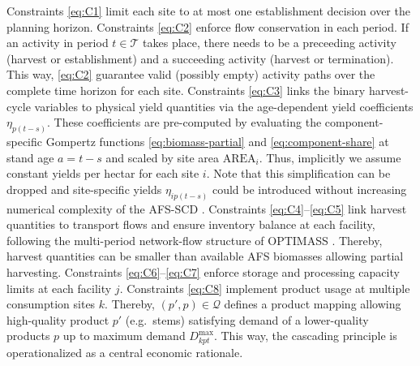 \documentclass[preprint,review,1p,authoryear]{elsarticle} %
\begin{document}
Constraints \eqref{eq:C1} limit each site to at most one establishment
decision over the planning horizon. Constraints \eqref{eq:C2} enforce
flow conservation in each period. If an activity in period \(t \in \mathcal{T}\)
takes place, there needs to be a preceeding activity (harvest or
establishment) and a succeeding activity (harvest or termination). This
way, \eqref{eq:C2} guarantee valid (possibly empty) activity paths over
the complete time horizon for each site. Constraints \eqref{eq:C3} links
the binary harvest-cycle variables to physical yield quantities via the
age-dependent yield coefficients \(\eta_{p(t-s)}\). These coefficients are
pre-computed by evaluating the component-specific Gompertz functions
\eqref{eq:biomass-partial} and \eqref{eq:component-share} at stand age
\(a = t - s\) and scaled by site area \(\text{AREA}_i\). Thus, implicitly we
assume constant yields per hectar for each site \(i\). Note that this
simplification can be dropped and site-specific yields \(\eta_{ip(t-s)}\)
could be introduced without increasing numerical complexity of the
AFS-SCD . Constraints \eqref{eq:C4}--\eqref{eq:C5} link harvest
quantities to transport flows and ensure inventory balance at each
facility, following the multi-period network-flow structure of OPTIMASS
\citep{DeMeyer2015_OPTIMASS, DeMeyer2016_tOPTIMASS}. Thereby, harvest
quantities can be smaller than available AFS biomasses allowing partial
harvesting. Constraints \eqref{eq:C6}--\eqref{eq:C7} enforce storage and
processing capacity limits at each facility \(j\). Constraints
\eqref{eq:C8} implement product usage at multiple consumption sites \(k\).
Thereby, \((p',p) \in \mathcal{Q}\) defines a product mapping allowing
high-quality product \(p'\) (e.g.~stems) satisfying demand of a
lower-quality products \(p\) up to maximum demand \(D^{\max}_{kpt}\). This
way, the cascading principle is operationalized as a central economic
rationale.
\end{document}

